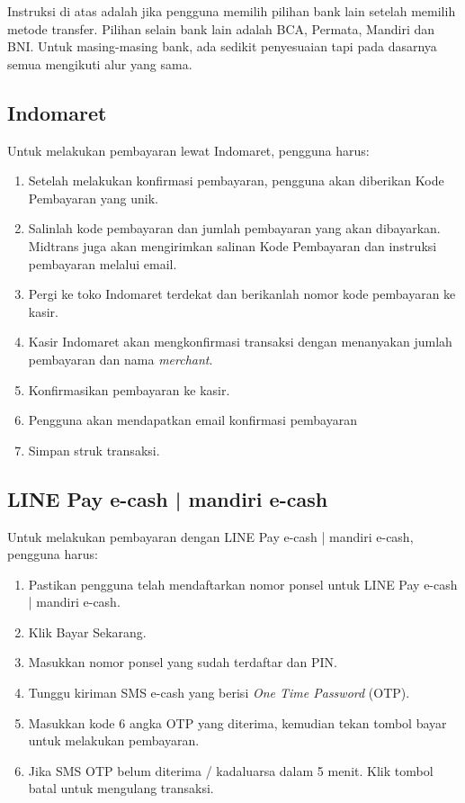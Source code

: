 Instruksi di atas adalah jika pengguna memilih pilihan bank lain setelah memilih metode transfer. Pilihan selain bank lain adalah BCA, Permata, Mandiri dan BNI. Untuk masing-masing bank, ada sedikit penyesuaian tapi pada dasarnya semua mengikuti alur yang sama.

\subsection{Indomaret}
\label{subsec:indomaret}
Untuk melakukan pembayaran lewat Indomaret, pengguna harus:

\begin{enumerate}
    \item Setelah melakukan konfirmasi pembayaran, pengguna akan diberikan Kode Pembayaran yang unik.
    \item Salinlah kode pembayaran dan jumlah pembayaran yang akan dibayarkan. Midtrans juga akan mengirimkan salinan Kode Pembayaran dan instruksi pembayaran melalui email.
    \item Pergi ke toko Indomaret terdekat dan berikanlah nomor kode pembayaran ke kasir.
    \item Kasir Indomaret akan mengkonfirmasi transaksi dengan menanyakan jumlah pembayaran dan nama \textit{merchant}.
    \item Konfirmasikan pembayaran ke kasir.
    \item Pengguna akan mendapatkan email konfirmasi pembayaran
    \item Simpan struk transaksi.
\end{enumerate}

\subsection{LINE Pay e-cash | mandiri e-cash}
\label{subsec:linepayecash}
Untuk melakukan pembayaran dengan LINE Pay e-cash | mandiri e-cash, pengguna harus:

\begin{enumerate}
    \item Pastikan pengguna telah mendaftarkan nomor ponsel untuk LINE Pay e-cash | mandiri e-cash.
    \item Klik Bayar Sekarang.
    \item Masukkan nomor ponsel yang sudah terdaftar dan PIN.
    \item Tunggu kiriman SMS e-cash yang berisi \textit{One Time Password} (OTP).
    \item Masukkan kode 6 angka OTP yang diterima, kemudian tekan tombol bayar untuk melakukan pembayaran.
    \item Jika SMS OTP belum diterima / kadaluarsa dalam 5 menit. Klik tombol batal untuk mengulang transaksi.

\end{enumerate}


